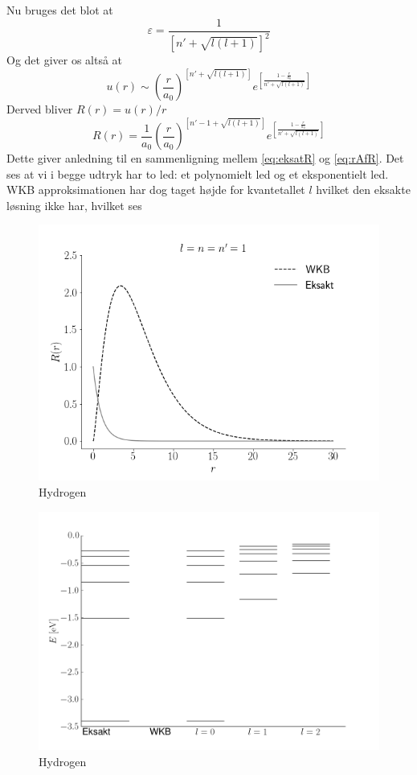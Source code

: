 Nu bruges det blot at
\begin{equation}
  \varepsilon = \frac{1}{\left[n'+\sqrt{l(l+1)}\right]^2}
\end{equation}
Og det giver os altså at
\begin{equation}
  u(r) \sim {\left(\frac{r}{a_0}\right)}^{\left[n'+\sqrt{l(l+1)}\right]} e^{\left[\frac{1-\frac{r}{a_0}}{n'+\sqrt{l(l+1)}}\right]}
\end{equation}
Derved bliver $R(r) = u(r)/r$
\begin{equation}
  R(r) = \frac{1}{a_0}{\left(\frac{r}{a_0}\right)}^{\left[n'-1+\sqrt{l(l+1)}\right]} e^{\left[\frac{1-\frac{r}{a_0}}{n'+\sqrt{l(l+1)}}\right]}
  \label{eq:rAfR}
\end{equation}
Dette giver anledning til en sammenligning mellem \cref{eq:eksatR} og \cref{eq:rAfR}. Det ses at vi i begge udtryk har to led: et polynomielt led og et eksponentielt led. WKB approksimationen har dog taget højde for kvantetallet $l$ hvilket den eksakte løsning ikke har, hvilket ses

\begin{figure}[h!]
    \centering
    \includegraphics[width=\columnwidth]{sammenligning.png}
    \caption{Hydrogen}
    \label{fig:hydrogen}
\end{figure}

\begin{figure}[h!]
    \centering
    \includegraphics[width=\columnwidth]{energyPlot}
    \caption{Hydrogen}
    \label{fig:hydrogen}
\end{figure}


%

